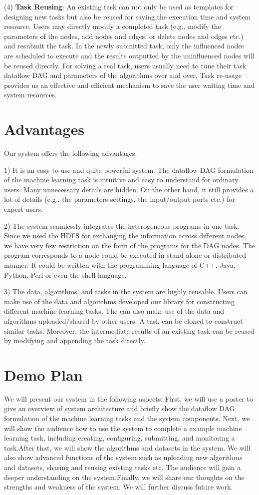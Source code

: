 \documentclass{sig-alternate-05-2015}
\begin{document}
(4) \textbf{Task Reusing}: An existing task can not only be used as templates for designing new tasks but also be reused for saving the execution time and system resource. Users may directly modify a completed task (e.g., modify the parameters of the nodes, add nodes and edges, or delete nodes and edges etc.) and resubmit the task. In the newly submitted task, only the influenced nodes are scheduled to execute and the results outputted by the uninfluenced nodes will be reused directly. For solving a real task, users usually need to tune their task dataflow DAG and parameters of the algorithms over and over. Task re-usage provides us an effective and efficient mechanism to save the user waiting time and system resources.


\section{Advantages}
Our system offers the following advantages.

1) It is an easy-to-use and quite powerful system. The dataflow DAG formulation of the machine learning task is intuitive and easy to understand for ordinary users. Many unnecessary details are hidden. On the other hand, it still provides a lot of details (e.g., the parameters settings, the input/output ports etc.) for expert users.

2) The system seamlessly integrates the heterogeneous programs in one task. Since we used the HDFS for exchanging the information across different nodes, we have very few restriction on the form of the programs for the DAG nodes. The program corresponds to a node could be executed in stand-alone or distributed manner. It could be written with the programming language of C++, Java, Python, Perl or even the shell language.

3) The data, algorithms, and tasks in the system are highly reusable. Users can make use of the data and algorithms developed our library for constructing different machine learning tasks. The can also make use of the data and algorithms uploaded/shared by other users. A task can be cloned to construct similar tasks. Moreover, the intermediate results of an existing task can be reused by modifying and appending the task directly.


\section{Demo Plan}
We will present our system in the following aspects: First, we will use a poster to give an overview of system architecture and briefly show the dataflow DAG formulation of the machine learning tasks and the system components.
Next, we will show the audience how to use the system to complete a example machine learning task, including creating, configuring, submitting, and monitoring a task.After that, we will show the algorithms and datasets in the system. We will also show advanced functions of the system such as uploading new algorithms and datasets, sharing and reusing existing tasks etc. The audience will gain a deeper understanding on the system.Finally, we will share our thoughts on the strengths and weakness of the system. We will further discuss future work.
\end{document}
